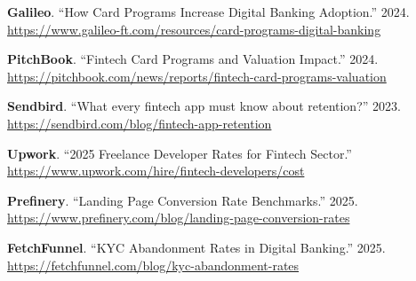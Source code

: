 \documentclass[11pt,letterpaper]{article}
\begin{document}
\begin{enumerate}[label={[{\arabic*}]}]
\item \textbf{Galileo}. ``How Card Programs Increase Digital Banking Adoption.'' 2024.  
      \url{https://www.galileo-ft.com/resources/card-programs-digital-banking}

\item \textbf{PitchBook}. ``Fintech Card Programs and Valuation Impact.'' 2024.  
      \url{https://pitchbook.com/news/reports/fintech-card-programs-valuation}

\item \textbf{Sendbird}. ``What every fintech app must know about retention?'' 2023.  
      \url{https://sendbird.com/blog/fintech-app-retention}

\item \textbf{Upwork}. ``2025 Freelance Developer Rates for Fintech Sector.''  
      \url{https://www.upwork.com/hire/fintech-developers/cost}

\item \textbf{Prefinery}. ``Landing Page Conversion Rate Benchmarks.'' 2025.  
      \url{https://www.prefinery.com/blog/landing-page-conversion-rates}

\item \textbf{FetchFunnel}. ``KYC Abandonment Rates in Digital Banking.'' 2025.  
      \url{https://fetchfunnel.com/blog/kyc-abandonment-rates}

\end{enumerate}
\end{document}
